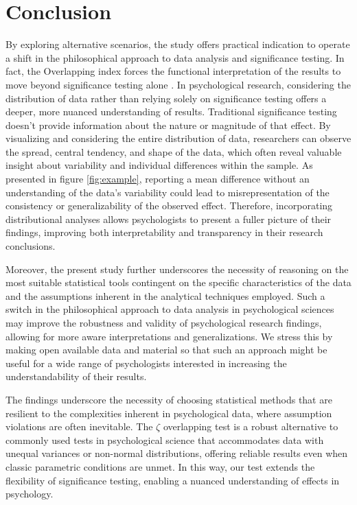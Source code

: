 \documentclass[twocolumn]{article}\usepackage[]{graphicx}\usepackage[]{xcolor}
\begin{document}
\section{Conclusion}

By exploring alternative scenarios, the study offers practical indication to operate a shift in the philosophical approach to data analysis and significance testing. In fact, the Overlapping index forces the functional interpretation of the results to move beyond significance testing alone \cite{pastore2018overlapping, steegen2016increasing, gelman2018failure}. In psychological research, considering the distribution of data rather than relying solely on significance testing offers a deeper, more nuanced understanding of results. Traditional significance testing doesn't provide information about the nature or magnitude of that effect. By visualizing and considering the entire distribution of data, researchers can observe the spread, central tendency, and shape of the data, which often reveal valuable insight about variability and individual differences within the sample.  As presented in figure \ref{fig:example}, reporting a mean difference without an understanding of the data's variability could lead to misrepresentation of the consistency or generalizability of the observed effect. Therefore, incorporating distributional analyses allows psychologists to present a fuller picture of their findings, improving both interpretability and transparency in their research conclusions. 

Moreover, the present study further underscores the necessity of reasoning on the most suitable statistical tools contingent on the specific characteristics of the data and the assumptions inherent in the analytical techniques employed. Such a switch in the philosophical approach to data analysis in psychological sciences \cite{vasishth2021embrace} may improve the robustness and validity of psychological research findings, allowing for more aware interpretations and generalizations. We stress this by making open available data and material so that such an approach might be useful for a wide range of psychologists interested in increasing the understandability of their results. 

The findings underscore the necessity of choosing statistical methods that are resilient to the complexities inherent in psychological data, where assumption violations are often inevitable. The $\zeta$ overlapping test is a robust alternative to commonly used tests in psychological science that accommodates data with unequal variances or non-normal distributions, offering reliable results even when classic parametric conditions are unmet. In this way, our test extends the flexibility of significance testing, enabling a nuanced understanding of effects in psychology.
\end{document}
